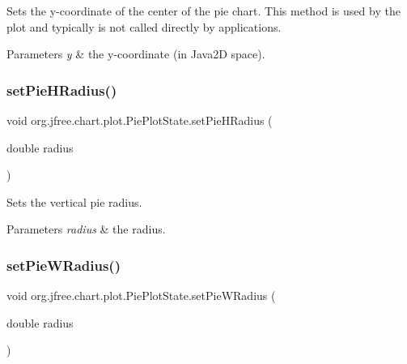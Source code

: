 Sets the y-\/coordinate of the center of the pie chart. This method is used by the plot and typically is not called directly by applications.


\begin{DoxyParams}{Parameters}
{\em y} & the y-\/coordinate (in Java2D space). \\
\hline
\end{DoxyParams}
\mbox{\label{classorg_1_1jfree_1_1chart_1_1plot_1_1_pie_plot_state_ae12f2fff3e520bc2a7fd592a2dbc843f}} 
\subsubsection{\texorpdfstring{set\+Pie\+H\+Radius()}{setPieHRadius()}}
{\footnotesize\ttfamily void org.\+jfree.\+chart.\+plot.\+Pie\+Plot\+State.\+set\+Pie\+H\+Radius (\begin{DoxyParamCaption}\item[{double}]{radius }\end{DoxyParamCaption})}

Sets the vertical pie radius.


\begin{DoxyParams}{Parameters}
{\em radius} & the radius. \\
\hline
\end{DoxyParams}
\mbox{\label{classorg_1_1jfree_1_1chart_1_1plot_1_1_pie_plot_state_a36df269d9579c40b905c64ed0ac4248b}} 
\subsubsection{\texorpdfstring{set\+Pie\+W\+Radius()}{setPieWRadius()}}
{\footnotesize\ttfamily void org.\+jfree.\+chart.\+plot.\+Pie\+Plot\+State.\+set\+Pie\+W\+Radius (\begin{DoxyParamCaption}\item[{double}]{radius }\end{DoxyParamCaption})}


